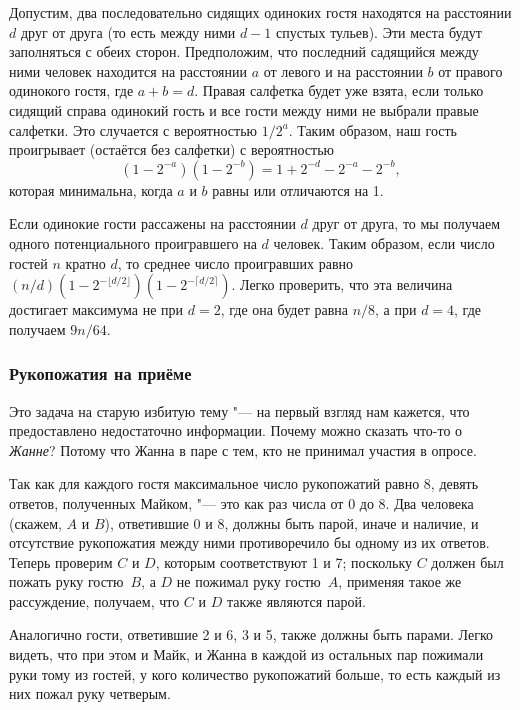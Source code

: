 \documentclass[twoside]{book}
\begin{document}
Допустим, два последовательно сидящих одиноких гостя находятся на
расстоянии $d$ друг от друга (то есть между ними $d-1$ спустых тульев).
Эти места будут заполняться с обеих сторон.
Предположим, что последний садящийся между ними человек находится на расстоянии $a$ от левого и на расстоянии $b$ от правого одинокого гостя, где $a+b=d$.
Правая салфетка будет уже взята, если только сидящий справа одинокий
гость и все гости между ними не выбрали правые салфетки.
Это случается с вероятностью $1/2^a$.
Таким образом, наш
гость проигрывает (остаётся без салфетки) с вероятностью
\[(1-2^{-a})(1-2^{-b})=1 + 2^{-d}-2^{-a}-2^{-b},\]
которая минимальна, когда $a$ и $b$ равны или отличаются на 1.

Если одинокие гости рассажены на расстоянии $d$ друг от друга, то мы получаем одного потенциального проигравшего на $d$ человек.
Таким образом, если число гостей $n$ кратно $d$, то среднее число проигравших равно $(n/d)(1-2^{-\lfloor d/2\rfloor})(1-2^{-\lceil d/2\rceil})$.
Легко проверить, что эта величина достигает максимума не при $d=2$, где она будет равна $n/8$, а при $d=4$, где получаем $9n/64$.
\heart

\subsubsection*{Рукопожатия на приёме}%

Это задача на старую избитую тему "--- на первый взгляд нам кажется, что предоставлено недостаточно информации.
Почему можно сказать что-то о \emph{Жанне}? 
Потому что Жанна в паре с тем, кто не принимал участия в опросе.

Так как для каждого гостя максимальное число рукопожатий равно 8, 
девять ответов, полученных Майком, "--- это как раз числа от 0 до 8.
Два человека (скажем, $A$ и $B$), ответившие 0 и 8, должны быть парой,
иначе и наличие, и отсутствие рукопожатия между ними противоречило бы одному из их ответов.
Теперь проверим $C$ и $D$, которым соответствуют 1 и 7;
поскольку $C$ должен был пожать руку гостю~$B$, а $D$ не пожимал руку гостю~$A$, применяя такое же рассуждение, получаем, что $C$ и $D$ также являются парой.


Аналогично гости, ответившие 2 и 6, 3 и 5,
также должны быть парами.
Легко видеть, что при этом и Майк, и Жанна в каждой из
остальных пар пожимали руки тому из гостей,
у кого количество рукопожатий больше, то есть каждый из них пожал руку
четверым. \heart
\end{document}
